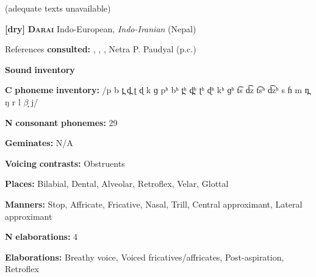 \begin{styleBody}
(adequate texts unavailable)
\end{styleBody}

\begin{styleBody}
\textbf{[dry]}   \textbf{\textsc{Darai}}    Indo-European, \textit{Indo-Iranian} (Nepal)
\end{styleBody}

\begin{styleBody}
References \textbf{consulted:} \citet{Dhakal2012}, \citet{KotapishKotapish1978}, \citet{Paudyal2003}, Netra P. Paudyal (p.c.)
\end{styleBody}

\begin{styleBody}
\textbf{Sound} \textbf{inventory}
\end{styleBody}

\begin{styleBody}
\textbf{C} \textbf{phoneme} \textbf{inventory:} /p b t̪ d̪ ʈ ɖ k ɡ pʰ bʰ t̪ʰ d̪ʰ ʈʰ ɖʰ kʰ ɡʰ t͡s d͡z t͡sʰ d͡zʰ s ɦ m n̪ ŋ r l $\beta ̞$ j/
\end{styleBody}

\begin{styleBody}
\textbf{N} \textbf{consonant} \textbf{phonemes:} 29
\end{styleBody}

\begin{styleBody}
\textbf{Geminates:} N/A
\end{styleBody}

\begin{styleBody}
\textbf{Voicing} \textbf{contrasts:} Obstruents
\end{styleBody}

\begin{styleBody}
\textbf{Places:} Bilabial, Dental, Alveolar, Retroflex, Velar, Glottal
\end{styleBody}

\begin{styleBody}
\textbf{Manners:} Stop, Affricate, Fricative, Nasal, Trill, Central approximant, Lateral approximant
\end{styleBody}

\begin{styleBody}
\textbf{N} \textbf{elaborations:} 4
\end{styleBody}

\begin{styleBody}
\textbf{Elaborations:} Breathy voice, Voiced fricatives/affricates, Post-aspiration, Retroflex
\end{styleBody}

